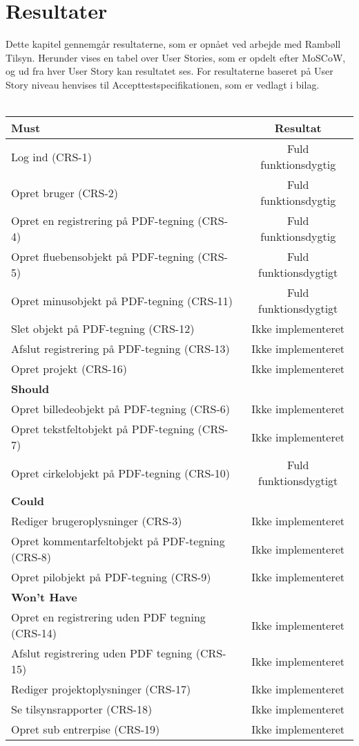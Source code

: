 \chapter{Resultater}
Dette kapitel gennemgår resultaterne, som er opnået ved arbejde med Rambøll Tilsyn. Herunder vises en tabel over User Stories, som er opdelt efter MoSCoW, og ud fra hver User Story kan resultatet ses.
For resultaterne baseret på User Story niveau henvises til Accepttestspecifikationen, som er vedlagt i bilag. \\ \\
\begin{tabular}{ l | c  }
	\hline
	\textbf{Must} & \textbf{Resultat} \\ \hline
	Log ind (CRS-1) & Fuld funktionsdygtig \\
	\hline
	Opret bruger (CRS-2) & Fuld funktionsdygtig \\
	\hline
	Opret en registrering på PDF-tegning (CRS-4) & Fuld funktionsdygtig\\
	\hline
	Opret fluebensobjekt på PDF-tegning (CRS-5) & Fuld funktionsdygtigt\\
	\hline
	Opret minusobjekt på PDF-tegning (CRS-11) & Fuld funktionsdygtigt\\
	\hline
	Slet objekt på PDF-tegning (CRS-12) & Ikke implementeret\\
	\hline
	Afslut registrering på PDF-tegning (CRS-13) & Ikke implementeret\\
	\hline
	Opret projekt (CRS-16) & Ikke implementeret\\
	\hline
	\hline
	\textbf{Should} &  \\ \hline
	Opret billedeobjekt på PDF-tegning (CRS-6) & Ikke implementeret\\
	\hline
	Opret tekstfeltobjekt på PDF-tegning (CRS-7) & Ikke implementeret\\
	\hline
	Opret cirkelobjekt på PDF-tegning (CRS-10) & Fuld funktionsdygtigt\\
	\hline
	\hline
	\textbf{Could} &  \\ \hline
	Rediger brugeroplysninger (CRS-3) & Ikke implementeret\\
	\hline
	Opret kommentarfeltobjekt på PDF-tegning (CRS-8)  & Ikke implementeret\\
	\hline
	Opret pilobjekt på PDF-tegning (CRS-9) & Ikke implementeret\\
	\hline
	\hline
	\textbf{Won't Have} & \\ \hline
	Opret en registrering uden PDF tegning (CRS-14) & Ikke implementeret\\
	\hline
	Afslut registrering uden PDF tegning (CRS-15) & Ikke implementeret\\
	\hline
	Rediger projektoplysninger (CRS-17) & Ikke implementeret\\
	\hline
	Se tilsynsrapporter (CRS-18) & Ikke implementeret\\
	\hline
	Opret sub entrerpise (CRS-19) & Ikke implementeret\\
	\hline
\end{tabular} \\




